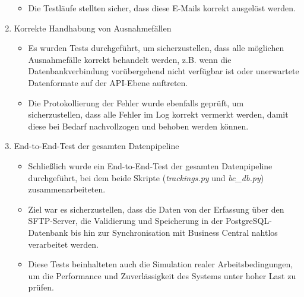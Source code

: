 \begin{enumerate}
\begin{itemize}
        \item Die Testläufe stellten sicher, dass diese E-Mails korrekt ausgelöst werden.
    \end{itemize}
    \item Korrekte Handhabung von Ausnahmefällen
    \begin{itemize}
        \item Es wurden Tests durchgeführt, um sicherzustellen, dass alle möglichen Ausnahmefälle korrekt behandelt werden, z.B. wenn die Datenbankverbindung vorübergehend nicht verfügbar ist oder unerwartete Datenformate auf der API-Ebene auftreten.
        \item Die Protokollierung der Fehler wurde ebenfalls geprüft, um sicherzustellen, dass alle Fehler im Log korrekt vermerkt werden, damit diese bei Bedarf nachvollzogen und behoben werden können.
    \end{itemize}
    \item End-to-End-Test der gesamten Datenpipeline
    \begin{itemize}
        \item Schließlich wurde ein End-to-End-Test der gesamten Datenpipeline durchgeführt, bei dem beide Skripte (\textit{trackings.py} und \textit{bc\_db.py}) zusammenarbeiteten.
        \item Ziel war es sicherzustellen, dass die Daten von der Erfassung über den SFTP-Server, die Validierung und Speicherung in der PostgreSQL-Datenbank bis hin zur Synchronisation mit Business Central nahtlos verarbeitet werden.
        \item Diese Tests beinhalteten auch die Simulation realer Arbeitsbedingungen, um die Performance und Zuverlässigkeit des Systems unter hoher Last zu prüfen.
    \end{itemize}
\end{enumerate}
